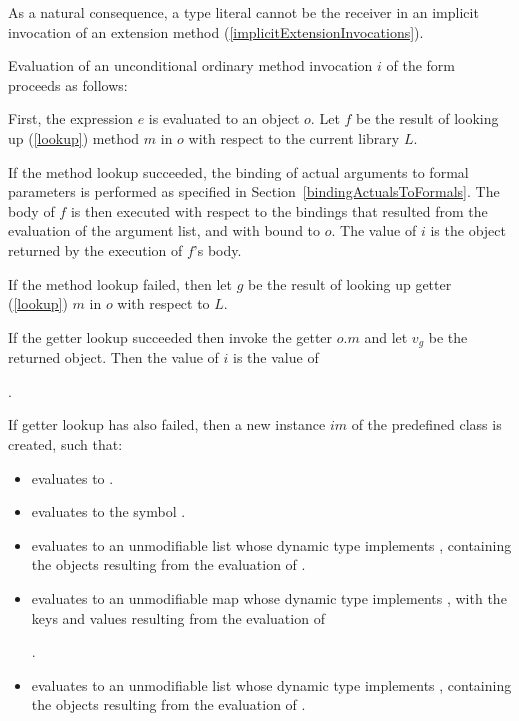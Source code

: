 \documentclass[makeidx]{article}
\begin{document}
{{As a natural consequence,
a type literal cannot be the receiver in
an implicit invocation of an extension method
(\ref{implicitExtensionInvocations}).%
}

\LMHash{}%
Evaluation of an unconditional ordinary method invocation $i$ of the form
proceeds as follows:

\LMHash{}%
First, the expression $e$ is evaluated to an object $o$.
Let $f$ be the result of looking up
(\ref{lookup})
method $m$ in $o$ with respect to the current library $L$.

\LMHash{}%
If the method lookup succeeded,
the binding of actual arguments to formal parameters is performed
as specified in Section~\ref{bindingActualsToFormals}.
The body of $f$ is then executed with respect to the bindings
that resulted from the evaluation of the argument list,
and with \THIS{} bound to $o$.
The value of $i$ is the object returned by the execution of $f$'s body.

\LMHash{}%
If the method lookup failed,
then let $g$ be the result of looking up getter
(\ref{lookup})
$m$ in $o$ with respect to $L$.

\LMHash{}%
If the getter lookup succeeded then invoke the getter $o.m$
and let $v_g$ be the returned object.
Then the value of $i$ is the value of

\noindent
{}.

\LMHash{}%
If getter lookup has also failed,
then a new instance $im$ of the predefined class  is created,
such that:
\begin{itemize}
\item {} evaluates to \TRUE.
\item {} evaluates to the symbol .
\item {} evaluates to an unmodifiable list
  whose dynamic type implements ,
  containing the objects resulting from the evaluation of
  .
\item {} evaluates to an unmodifiable map
  whose dynamic type implements ,
  with the keys and values resulting from the evaluation of

  .
\item {} evaluates to an unmodifiable list
  whose dynamic type implements ,
  containing the objects resulting from the evaluation of
  .
\end{itemize}

}
\end{document}
